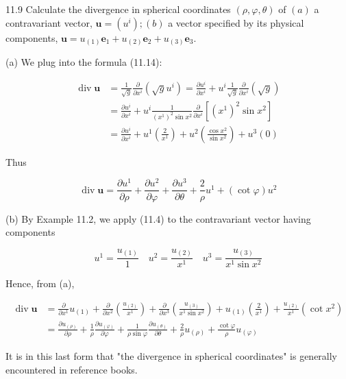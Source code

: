 \documentclass[10pt]{article}
\begin{document}
11.9 Calculate the divergence in spherical coordinates $(\rho, \varphi, \theta)$ of $(a)$ a contravariant vector, $\mathbf{u}=\left(u^{i}\right) ;(b)$ a vector specified by its physical components, $\mathbf{u}=u_{(1)} \mathbf{e}_{1}+u_{(2)} \mathbf{e}_{2}+u_{(3)} \mathbf{e}_{3}$.

(a) We plug into the formula (11.14):

$$
\begin{aligned}
\operatorname{div} \mathbf{u} & =\frac{1}{\sqrt{g}} \frac{\partial}{\partial x^{i}}\left(\sqrt{g} u^{i}\right)=\frac{\partial u^{i}}{\partial x^{i}}+u^{i} \frac{1}{\sqrt{g}} \frac{\partial}{\partial x^{i}}(\sqrt{g}) \\
& =\frac{\partial u^{i}}{\partial x^{i}}+u^{i} \frac{1}{\left(x^{1}\right)^{2} \sin x^{2}} \frac{\partial}{\partial x^{i}}\left[\left(x^{1}\right)^{2} \sin x^{2}\right] \\
& =\frac{\partial u^{i}}{\partial x^{i}}+u^{1}\left(\frac{2}{x^{1}}\right)+u^{2}\left(\frac{\cos x^{2}}{\sin x^{2}}\right)+u^{3}(0)
\end{aligned}
$$

Thus

$$
\operatorname{div} \mathbf{u}=\frac{\partial u^{1}}{\partial \rho}+\frac{\partial u^{2}}{\partial \varphi}+\frac{\partial u^{3}}{\partial \theta}+\frac{2}{\rho} u^{1}+(\cot \varphi) u^{2}
$$

(b) By Example 11.2, we apply (11.4) to the contravariant vector having components

$$
u^{1}=\frac{u_{(1)}}{1} \quad u^{2}=\frac{u_{(2)}}{x^{1}} \quad u^{3}=\frac{u_{(3)}}{x^{1} \sin x^{2}}
$$

Hence, from (a),

$$
\begin{aligned}
\operatorname{div} \mathbf{u} & =\frac{\partial}{\partial x^{1}} u_{(1)}+\frac{\partial}{\partial x^{2}}\left(\frac{u_{(2)}}{x^{1}}\right)+\frac{\partial}{\partial x^{3}}\left(\frac{u_{(3)}}{x^{1} \sin x^{2}}\right)+u_{(1)}\left(\frac{2}{x^{1}}\right)+\frac{u_{(2)}}{x^{1}}\left(\cot x^{2}\right) \\
& =\frac{\partial u_{(\rho)}}{\partial \rho}+\frac{1}{\rho} \frac{\partial u_{(\varphi)}}{\partial \varphi}+\frac{1}{\rho \sin \varphi} \frac{\partial u_{(\theta)}}{\partial \theta}+\frac{2}{\rho} u_{(\rho)}+\frac{\cot \varphi}{\rho} u_{(\varphi)}
\end{aligned}
$$

It is in this last form that "the divergence in spherical coordinates" is generally encountered in reference books.
\end{document}

